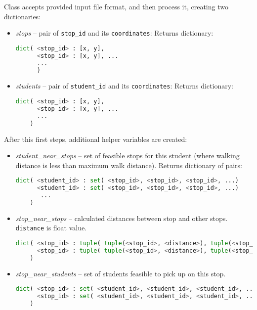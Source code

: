 \documentclass [a4paper, 12pt]{article}
\begin{document}
Class accepts provided input file format, and then process it, creating two dictionaries:
\begin{itemize}
    \item \textit{stops} -- pair of \texttt{stop_id} and its \texttt{coordinates}:
        Returns dictionary:
\begin{lstlisting}[basicstyle=\scriptsize,language=Python]
dict( <stop_id> : [x, y],
      <stop_id> : [x, y], ...
      ...
      )\end{lstlisting}
    \item \textit{students} -- pair of \texttt{student_id} and its \texttt{coordinates}:
        Returns dictionary:
\begin{lstlisting}[basicstyle=\scriptsize,language=Python]
dict( <stop_id> : [x, y],
      <stop_id> : [x, y], ...
      ...
    )\end{lstlisting}
\end{itemize}

After this first steps, additional helper variables are created:
\begin{itemize}
    \item \textit{student_near_stops} -- set of feasible stops for this student (where walking distance is less than maximum walk distance).
        Returns dictionary of pairs:
       \begin{lstlisting}[basicstyle=\scriptsize,language=Python]
dict( <student_id> : set( <stop_id>, <stop_id>, <stop_id>, ...)
      <student_id> : set( <stop_id>, <stop_id>, <stop_id>, ...)
       ...
    )\end{lstlisting}

    \item \textit{stop_near_stops} --  calculated distances between stop and other stops. \texttt{distance} is float value.
        \begin{lstlisting}[basicstyle=\scriptsize,language=Python]
dict( <stop_id> : tuple( tuple(<stop_id>, <distance>), tuple(<stop_id>, <distance>), ...)
      <stop_id> : tuple( tuple(<stop_id>, <distance>), tuple(<stop_id>, <distance>), ...)
    )\end{lstlisting}


    \item \textit{stop_near_students} -- set of students feasible to pick up on this stop.
        \begin{lstlisting}[basicstyle=\scriptsize,language=Python]
dict( <stop_id> : set( <student_id>, <student_id>, <student_id>, ...)
      <stop_id> : set( <student_id>, <student_id>, <student_id>, ...)
    )\end{lstlisting}
\end{itemize}
\end{document}
